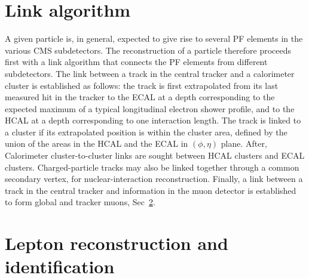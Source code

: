 \section{Link algorithm}
A given particle is, in general, expected to give rise to several PF elements in the various CMS
subdetectors. The reconstruction of a particle therefore proceeds first with a
link algorithm that connects the PF elements from different subdetectors.
The link between a track in the central tracker and a calorimeter cluster is established as follows:
the track is first extrapolated from its last measured hit in the tracker to
the ECAL at a depth corresponding to the expected maximum of a typical longitudinal electron shower
profile, and to the HCAL at a depth corresponding to one interaction length.  
The track is linked to a cluster if its extrapolated position is within the cluster area, defined by the union of the
areas in the HCAL and the ECAL in $(\phi, \eta)$ plane. 
After, Calorimeter cluster-to-cluster links are sought between HCAL clusters and ECAL clusters.
Charged-particle tracks may also be linked together through a common secondary vertex, for
nuclear-interaction reconstruction.
Finally, a link between a track in the central tracker and information in the muon detector is
established to form global and tracker muons, Sec~\ref{ler}.\\



\section{Lepton reconstruction and identification}
\label{ler}

